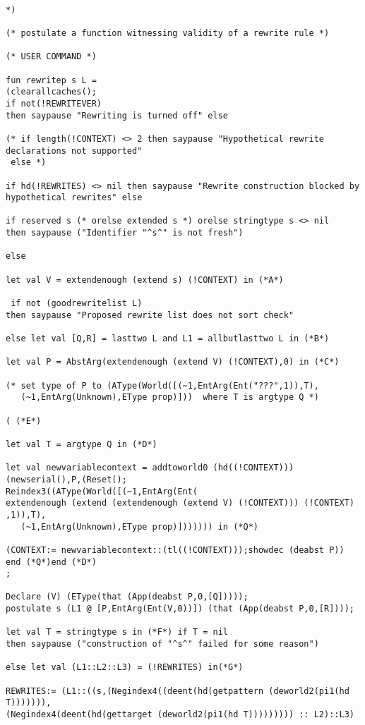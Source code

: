 \documentclass{article}
\begin{document}
\begin{verbatim}

*)

(* postulate a function witnessing validity of a rewrite rule *)

(* USER COMMAND *)

fun rewritep s L =
(clearallcaches();
if not(!REWRITEVER) 
then saypause "Rewriting is turned off" else

(* if length(!CONTEXT) <> 2 then saypause "Hypothetical rewrite declarations not supported"
 else *)

if hd(!REWRITES) <> nil then saypause "Rewrite construction blocked by hypothetical rewrites" else

if reserved s (* orelse extended s *) orelse stringtype s <> nil 
then saypause ("Identifier "^s^" is not fresh")

else 

let val V = extendenough (extend s) (!CONTEXT) in (*A*)

 if not (goodrewritelist L) 
then saypause "Proposed rewrite list does not sort check"

else let val [Q,R] = lasttwo L and L1 = allbutlasttwo L in (*B*)

let val P = AbstArg(extendenough (extend V) (!CONTEXT),0) in (*C*)

(* set type of P to (AType(World([(~1,EntArg(Ent("???",1)),T),
   (~1,EntArg(Unknown),EType prop)]))  where T is argtype Q *)

( (*E*)

let val T = argtype Q in (*D*)

let val newvariablecontext = addtoworld0 (hd((!CONTEXT)))
(newserial(),P,(Reset();
Reindex3((AType(World([(~1,EntArg(Ent(
extendenough (extend (extendenough (extend V) (!CONTEXT))) (!CONTEXT)
,1)),T),
   (~1,EntArg(Unknown),EType prop)])))))) in (*Q*)

(CONTEXT:= newvariablecontext::(tl((!CONTEXT)));showdec (deabst P)) end (*Q*)end (*D*)
;

Declare (V) (EType(that (App(deabst P,0,[Q]))));
postulate s (L1 @ [P,EntArg(Ent(V,0))]) (that (App(deabst P,0,[R])));

let val T = stringtype s in (*F*) if T = nil 
then saypause ("construction of "^s^" failed for some reason")

else let val (L1::L2::L3) = (!REWRITES) in(*G*)

REWRITES:= (L1::((s,(Negindex4((deent(hd(getpattern (deworld2(pi1(hd T))))))),
(Negindex4(deent(hd(gettarget (deworld2(pi1(hd T))))))))) :: L2)::L3)


\end{verbatim}
\end{document}
